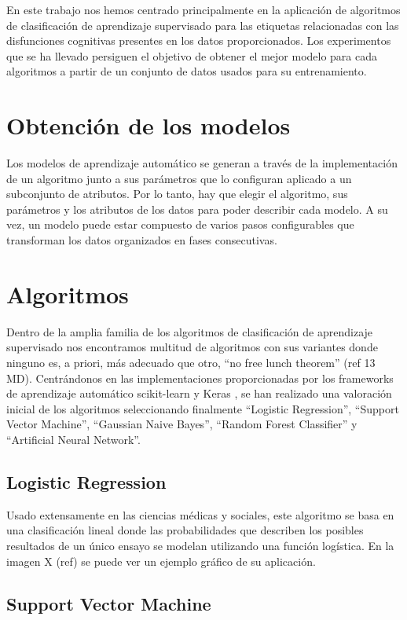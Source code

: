 En este trabajo nos hemos centrado principalmente en la aplicación de algoritmos de clasificación de aprendizaje supervisado para las etiquetas relacionadas con las disfunciones cognitivas presentes en los datos proporcionados. Los experimentos que se ha llevado persiguen el objetivo de obtener el mejor modelo para cada algoritmos a partir de un conjunto de datos usados para su entrenamiento.

\section{Obtención de los modelos}

Los modelos de aprendizaje automático se generan a través de la implementación de un algoritmo junto a sus parámetros que lo configuran aplicado a un subconjunto de atributos. Por lo tanto, hay que elegir el algoritmo, sus parámetros y los atributos de los datos para poder describir cada modelo. A su vez, un modelo puede estar compuesto de varios pasos configurables que transforman los datos organizados en fases consecutivas.

\section{Algoritmos}

Dentro de la amplia familia de los algoritmos de clasificación de aprendizaje supervisado nos encontramos multitud de algoritmos con sus variantes donde ninguno es, a priori, más adecuado que otro, ``no free lunch theorem'' (ref 13 MD). Centrándonos en las implementaciones proporcionadas por los frameworks de aprendizaje automático scikit-learn \cite{Scikit-learn:Documentation} y Keras \cite{KerasDocumentation}, se han realizado una valoración inicial de los algoritmos seleccionando finalmente ``Logistic Regression'', ``Support Vector Machine'', ``Gaussian Naive Bayes'', ``Random Forest Classifier'' y ``Artificial Neural Network''.

\subsection{Logistic Regression}
Usado extensamente en las ciencias médicas y sociales, este algoritmo se basa en una clasificación  lineal donde las probabilidades que describen los posibles resultados de un único ensayo se modelan utilizando una función logística. En la imagen X (ref) se puede ver un ejemplo gráfico de su aplicación.

\subsection{Support Vector Machine}

